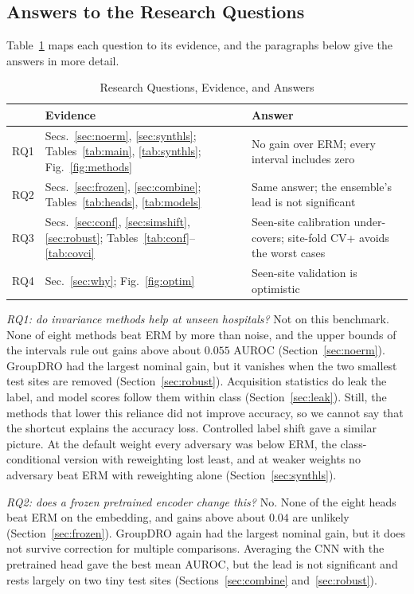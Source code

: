 \documentclass[journal]{IEEEtran}
\newcommand{\erm}{ERM}
\begin{document}
\subsection{Answers to the Research Questions}
Table~\ref{tab:rq} maps each question to its evidence, and the paragraphs below give the answers in more detail.
\begin{table}[!t]\centering\footnotesize
\caption{Research Questions, Evidence, and Answers}\label{tab:rq}
\begin{tabular}{@{}p{}p{}p{}@{}}
\toprule
 & Evidence & Answer \\
\midrule
RQ1 & Secs.~\ref{sec:noerm}, \ref{sec:synthls}; Tables~\ref{tab:main}, \ref{tab:synthls}; Fig.~\ref{fig:methods} & No gain over \erm{}; every interval includes zero \\
RQ2 & Secs.~\ref{sec:frozen}, \ref{sec:combine}; Tables~\ref{tab:heads}, \ref{tab:models} & Same answer; the ensemble's lead is not significant \\
RQ3 & Secs.~\ref{sec:conf}, \ref{sec:simshift}, \ref{sec:robust}; Tables~\ref{tab:conf}--\ref{tab:covci} & Seen-site calibration under-covers; site-fold CV+ avoids the worst cases \\
RQ4 & Sec.~\ref{sec:why}; Fig.~\ref{fig:optim} & Seen-site validation is optimistic \\
\bottomrule
\end{tabular}
\end{table}
\emph{RQ1: do invariance methods help at unseen hospitals?} Not on this benchmark. None of eight methods beat \erm{} by more than noise, and the upper bounds of the intervals rule out gains above about $0.055$ AUROC (Section~\ref{sec:noerm}). GroupDRO had the largest nominal gain, but it vanishes when the two smallest test sites are removed (Section~\ref{sec:robust}). Acquisition statistics do leak the label, and model scores follow them within class (Section~\ref{sec:leak}). Still, the methods that lower this reliance did not improve accuracy, so we cannot say that the shortcut explains the accuracy loss. Controlled label shift gave a similar picture. At the default weight every adversary was below \erm{}, the class-conditional version with reweighting lost least, and at weaker weights no adversary beat \erm{} with reweighting alone (Section~\ref{sec:synthls}).

\emph{RQ2: does a frozen pretrained encoder change this?} No. None of the eight heads beat \erm{} on the embedding, and gains above about $0.04$ are unlikely (Section~\ref{sec:frozen}). GroupDRO again had the largest nominal gain, but it does not survive correction for multiple comparisons. Averaging the CNN with the pretrained head gave the best mean AUROC, but the lead is not significant and rests largely on two tiny test sites (Sections~\ref{sec:combine} and~\ref{sec:robust}).
\end{document}
